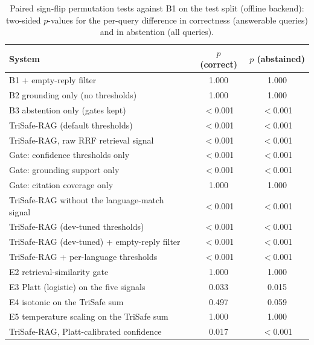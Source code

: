 \begin{table}[t]
  \caption{Paired sign-flip permutation tests against B1 on the test split (offline backend): two-sided $p$-values for the per-query difference in correctness (answerable queries) and in abstention (all queries).}
  \label{tab:tests-offline}
  \footnotesize
  \begin{tabular}{lcc}
    \toprule
    System & $p$ (correct) & $p$ (abstained) \\
    \midrule
    B1 + empty-reply filter & 1.000 & 1.000 \\
    B2 grounding only (no thresholds) & 1.000 & 1.000 \\
    B3 abstention only (gates kept) & $<$0.001 & $<$0.001 \\
    TriSafe-RAG (default thresholds) & $<$0.001 & $<$0.001 \\
    TriSafe-RAG, raw RRF retrieval signal & $<$0.001 & $<$0.001 \\
    Gate: confidence thresholds only & $<$0.001 & $<$0.001 \\
    Gate: grounding support only & $<$0.001 & $<$0.001 \\
    Gate: citation coverage only & 1.000 & 1.000 \\
    TriSafe-RAG without the language-match signal & $<$0.001 & $<$0.001 \\
    TriSafe-RAG (dev-tuned thresholds) & $<$0.001 & $<$0.001 \\
    TriSafe-RAG (dev-tuned) + empty-reply filter & $<$0.001 & $<$0.001 \\
    TriSafe-RAG + per-language thresholds & $<$0.001 & $<$0.001 \\
    E2 retrieval-similarity gate & 1.000 & 1.000 \\
    E3 Platt (logistic) on the five signals & 0.033 & 0.015 \\
    E4 isotonic on the TriSafe sum & 0.497 & 0.059 \\
    E5 temperature scaling on the TriSafe sum & 1.000 & 1.000 \\
    TriSafe-RAG, Platt-calibrated confidence & 0.017 & $<$0.001 \\
    \bottomrule
  \end{tabular}
\end{table}
